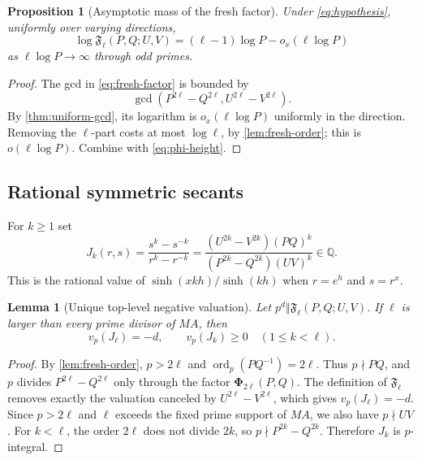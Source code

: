 \documentclass[11pt]{article}
\newtheorem{proposition}[theorem]{Proposition}
\newtheorem{lemma}[theorem]{Lemma}
\theoremstyle{definition}
\newcommand{\Q}{\mathbb Q}
\newcommand{\ord}{\operatorname{ord}}
\newcommand{\PhiHom}{\boldsymbol\Phi}
\begin{document}
\begin{proposition}[Asymptotic mass of the fresh factor]
\label{prop:fresh-mass}
Under \eqref{eq:hypothesis}, uniformly over varying directions,
\begin{equation}
 \boxed{
 \log\mathfrak F_\ell(P,Q;U,V)
 = (\ell-1)\log P-o_x(\ell\log P)
 }
 \label{eq:fresh-mass}
\end{equation}
as $\ell\log P\to\infty$ through odd primes.
\end{proposition}

\begin{proof}
The gcd in \eqref{eq:fresh-factor} is bounded by
\[
 \gcd(P^{2\ell}-Q^{2\ell},U^{2\ell}-V^{2\ell}).
\]
By \cref{thm:uniform-gcd}, its logarithm is $o_x(\ell\log P)$ uniformly in
the direction.  Removing the $\ell$-part costs at most $\log\ell$, by
\cref{lem:fresh-order}; this is $o(\ell\log P)$.  Combine with
\eqref{eq:phi-height}.
\end{proof}

\subsection{Rational symmetric secants}

For $k\ge1$ set
\begin{equation}
 J_k(r,s)=\frac{s^k-s^{-k}}{r^k-r^{-k}}
 =\frac{(U^{2k}-V^{2k})(PQ)^k}
 {(P^{2k}-Q^{2k})(UV)^k}\in\Q.
 \label{eq:Jk}
\end{equation}
This is the rational value of $\sinh(xkh)/\sinh(kh)$ when $r=e^h$ and
$s=r^x$.

\begin{lemma}[Unique top-level negative valuation]
\label{lem:unique-top-valuation}
Let $p^d\Vert\mathfrak F_\ell(P,Q;U,V)$.  If $\ell$ is larger than every
prime divisor of $MA$, then
\begin{equation}
 v_p(J_\ell)=-d,
 \qquad
 v_p(J_k)\ge0\quad(1\le k<\ell).
 \label{eq:top-valuation}
\end{equation}
\end{lemma}

\begin{proof}
By \cref{lem:fresh-order}, $p>2\ell$ and
$\ord_p(PQ^{-1})=2\ell$.  Thus $p\nmid PQ$, and $p$ divides
$P^{2\ell}-Q^{2\ell}$ only through the factor
$\PhiHom_{2\ell}(P,Q)$.  The definition of $\mathfrak F_\ell$ removes
exactly the valuation canceled by $U^{2\ell}-V^{2\ell}$, which gives
$v_p(J_\ell)=-d$.  Since $p>2\ell$ and $\ell$ exceeds the fixed prime
support of $MA$, we also have $p\nmid UV$.  For $k<\ell$, the order
$2\ell$ does not divide $2k$, so $p\nmid P^{2k}-Q^{2k}$.  Therefore $J_k$
is $p$-integral.
\end{proof}
\end{document}
